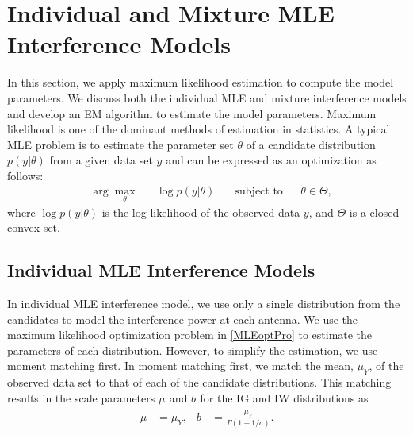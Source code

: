 \documentclass[12pt, draftclsnofoot, onecolumn]{IEEEtran}
\theoremstyle{plain}
\begin{document}
\section{Individual and Mixture MLE Interference Models} \label{SecV}%
In this section, we apply maximum likelihood estimation to compute the model parameters. We discuss both the individual MLE and mixture interference models and develop an EM algorithm to estimate the model parameters.
Maximum likelihood is one of the dominant methods of estimation in
statistics.
A typical MLE problem is to estimate the parameter set $\theta$ of a candidate distribution $p(y|\theta)$ from a given data set $y$ and can be expressed as an optimization as follows: %
\begin{equation} \label{MLEoptPro}
 \begin{aligned}
 & \arg \underset{\theta}{\max}
 & & \log p(y|\theta) \quad
 & \text{subject to}
 & & \theta \in \Theta,
 \end{aligned}
\end{equation}
where $\log p(y|\theta)$ is the log likelihood %
of the observed data $y$, and $\Theta$ is a closed convex set.
\vspace{-.15in}
\subsection{Individual MLE Interference Models}\vspace{-.1in}
In individual MLE interference model, we use only a single distribution from the candidates to model the interference power at each antenna. We use the maximum likelihood optimization problem in \eqref{MLEoptPro} to estimate the parameters of each distribution. However, to simplify the estimation, we use moment matching first. In moment matching first, we match the mean, $\mu_Y$, of the observed data set to that of each of the candidate distributions. This matching results in the scale parameters ${{\mu_{}}}$ and ${{b_{}}}$ for the IG and IW distributions as \vspace{-.1in}
\begin{align}\label{M1}
{{\mu_{}}}&=\mu_Y, &
{{b_{}}}&=\frac{\mu_Y}{\Gamma(1-1/{{c_{}}})}. 
\end{align}
\end{document}
